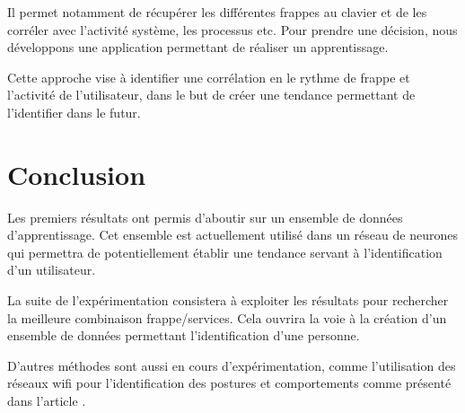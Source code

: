\documentclass[conference,compsoc]{IEEEtran}
\begin{document}
 Il permet notamment de récupérer les différentes frappes au clavier et de les corréler avec l'activité système, les processus etc.
 Pour prendre une décision, nous développons une application permettant de réaliser un apprentissage.

 Cette approche vise à identifier une corrélation en le rythme de frappe et l'activité de l'utilisateur, dans le but de créer une tendance permettant de l'identifier dans le futur.

\section{Conclusion}
Les premiers résultats ont permis d'aboutir sur un ensemble de données d'apprentissage. Cet ensemble est actuellement utilisé dans un réseau de neurones qui permettra de potentiellement établir une tendance servant à l'identification d'un utilisateur.

La suite de l'expérimentation consistera à exploiter les résultats pour rechercher la meilleure combinaison frappe/services. Cela ouvrira la voie à la création d'un ensemble de données permettant l'identification d'une personne.

D'autres méthodes sont aussi en cours d'expérimentation, comme l'utilisation des réseaux wifi pour l'identification des postures et comportements comme présenté dans l'article \cite{1608.03430}.





\end{document}
